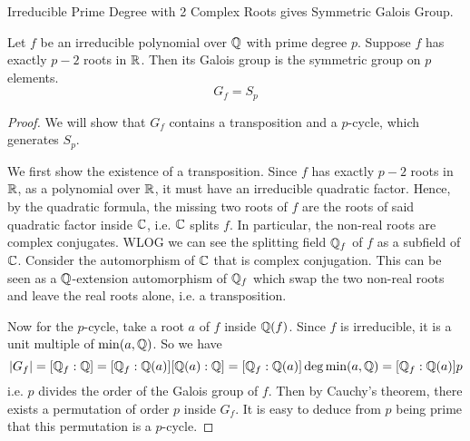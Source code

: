 \documentclass[../book.tex]{subfiles}
\begin{document}
\begin{thm} Irreducible Prime Degree with 2 Complex Roots 
gives Symmetric Galois Group. 
    
    Let $f$ be an irreducible polynomial over $\mathbb{Q}$ with prime degree $p$.
    Suppose $f$ has exactly $p-2$ roots in $\mathbb{R}$. 
    Then its Galois group is the symmetric group on $p$ elements. 
    \[ G_f = S_p \]
    
\end{thm}
\begin{proof}
    
    We will show that $G_f$ contains a transposition and a $p$-cycle,
    which generates $S_p$. 
    
    We first show the existence of a transposition. 
    Since $f$ has exactly $p-2$ roots in $\mathbb{R}$, 
    as a polynomial over $\mathbb{R}$, it must have an irreducible quadratic factor. 
    Hence, by the quadratic formula, 
    the missing two roots of $f$ are the roots of said quadratic factor inside $\mathbb{C}$,
    i.e. $\mathbb{C}$ splits $f$. 
    In particular, the non-real roots are complex conjugates. 
    WLOG we can see the splitting field $\mathbb{Q}_f$ of $f$ as a subfield of $\mathbb{C}$.
    Consider the automorphism of $\mathbb{C}$ that is complex conjugation. 
    This can be seen as a $\mathbb{Q}$-extension automorphism of $\mathbb{Q}_f$
    which swap the two non-real roots and leave the real roots alone, 
    i.e. a transposition. 
    
    Now for the $p$-cycle, take a root $a$ of $f$ inside $\mathbb{Q}(f)$.
    Since $f$ is irreducible, it is a unit multiple of $\min(a,\mathbb{Q})$. 
    So we have \[
        |G_f| = [\mathbb{Q}_f : \mathbb{Q}] = [\mathbb{Q}_f : \mathbb{Q}(a)] [\mathbb{Q}(a) : \mathbb{Q}]
        = [\mathbb{Q}_f : \mathbb{Q}(a)] \deg \min(a,\mathbb{Q}) = [\mathbb{Q}_f : \mathbb{Q}(a)] p 
    \]
    i.e. $p$ divides the order of the Galois group of $f$. 
    Then by Cauchy's theorem, there exists a permutation of order $p$ inside $G_f$. 
    It is easy to deduce from $p$ being prime that this permutation is a $p$-cycle. 
    
\end{proof}
\end{document}
